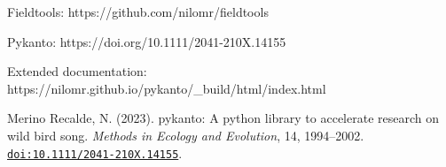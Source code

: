 Fieldtools: 
https://github.com/nilomr/fieldtools

Pykanto:
https://doi.org/10.1111/2041-210X.14155

Extended documentation:
https://nilomr.github.io/pykanto/_build/html/index.html

Merino Recalde, N. (2023). pykanto: A python library to accelerate research on wild bird song. \textit{Methods in Ecology and Evolution}, 14, 1994–2002. \href{https://doi.org/10.1111/2041-210X.14155}{\nolinkurl{doi:10.1111/2041-210X.14155}}.